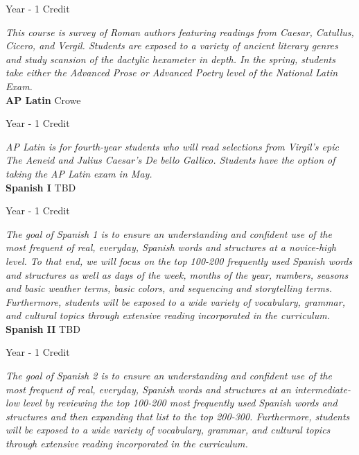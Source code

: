 \noindent Year - 1 Credit

\vspace{1mm}\emph{This course is survey of Roman authors featuring readings from Caesar, Catullus, Cicero, and Vergil. Students are exposed to a variety of ancient literary genres and study scansion of the dactylic hexameter in depth. In the spring, students take either the Advanced Prose or Advanced Poetry level of the National Latin Exam.}\\

\noindent\textbf{AP Latin} \hfill Crowe

\noindent Year - 1 Credit

\vspace{1mm}\emph{AP Latin is for fourth-year students who will read selections from Virgil's epic The Aeneid and Julius Caesar's De bello Gallico. Students have the option of taking the AP Latin exam in May.}\\

\noindent\textbf{Spanish I} \hfill TBD

\noindent Year - 1 Credit

\vspace{1mm}\emph{The goal of Spanish 1 is to ensure an understanding and confident use of the most frequent of real, everyday, Spanish words and structures at a novice-high level.  To that end, we will focus on the top 100-200 frequently used Spanish words and structures as well as days of the week, months of the year, numbers, seasons and basic weather terms, basic colors, and sequencing and storytelling terms.  Furthermore, students will be exposed to a wide variety of vocabulary, grammar, and cultural topics through extensive reading incorporated in the curriculum.}\\

\noindent\textbf{Spanish II} \hfill TBD

\noindent Year - 1 Credit

\vspace{1mm}\emph{The goal of Spanish 2 is to ensure an understanding and confident use of the most frequent of real, everyday, Spanish words and structures at an intermediate-low level by reviewing the top 100-200 most frequently used Spanish words and structures and then expanding that list to the top 200-300.  Furthermore, students will be exposed to a wide variety of vocabulary, grammar, and cultural topics through extensive reading incorporated in the curriculum.}\\

